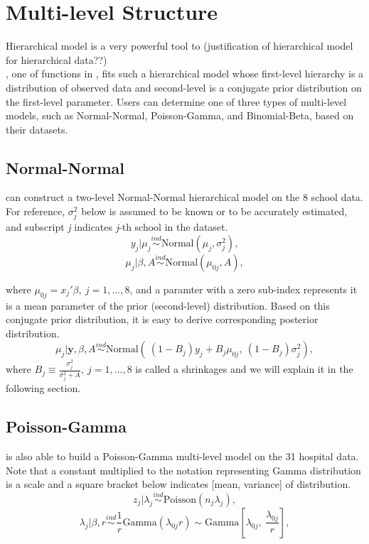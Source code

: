 \documentclass[article]{jss}
\begin{document}
\section[Multi-level Structure]{Multi-level Structure}
Hierarchical model is a very powerful tool to (justification of hierarchical model for hierarchical data??)
\\

, one of functions in , fits such a hierarchical model whose first-level hierarchy is a distribution of observed data and second-level is a conjugate prior distribution on the first-level parameter. Users can determine one of three types of multi-level models, such as Normal-Normal, Poisson-Gamma, and Binomial-Beta, based on their datasets. 
\\

 
\subsection[Normal-Normal]{Normal-Normal}
 can construct a two-level Normal-Normal hierarchical model on the 8 school data. For reference,  $\sigma^{2}_{j}$ below is assumed to be known or to be accurately estimated, and subscript \emph{j} indicates \emph{j}-th school in the dataset.
\begin{equation}
y_{j}\vert \mu_{j} \stackrel{ind}{\sim}\textrm{Normal}(\mu_{j}, \sigma^{2}_{j}),
\end{equation}
\begin{equation}
\mu_{j}\vert \beta, A\stackrel{ind}{\sim}\textrm{Normal}(\mu_{0j}, A),
\end{equation}

where $\mu_{0j} =x_{j}'\beta,~j=1, \ldots, 8$, and a paramter with a zero sub-index represents it is a mean parameter of the prior (second-level) distribution. Based on this conjugate prior distribution, it is easy to derive corresponding posterior distribution. 
\begin{equation}
\mu_{j}\vert \textbf{y}, \beta, A \stackrel{ind}{\sim}\textrm{Normal}(~(1-B_{j})y_{j} + B_{j}\mu_{0j},~(1-B_{j})\sigma^{2}_{j}),
\end{equation}
where $B_{j}\equiv\frac{\sigma^{2}_{j}}{\sigma^{2}_{j} + A},~j=1, \ldots, 8$ is called a shrinkages and we will explain it in the following section.

\subsection[Poisson-Gamma]{Poisson-Gamma}
 is also able to build a Poisson-Gamma multi-level model on the 31 hospital data. Note that a constant multiplied to the notation representing Gamma distribution is a scale and a square bracket below indicates [mean, variance] of distribution.
\begin{equation}
z_{j}\vert \lambda_{j} \stackrel{ind}{\sim}\textrm{Poisson}(n_{j}\lambda_{j}),
\end{equation}
\begin{equation}
\lambda_{j}\vert \beta, r\stackrel{ind}{\sim}\frac{1}{r}\textrm{Gamma}(\lambda_{0j}r)\sim \textrm{Gamma}[\lambda_{0j}, ~\frac{\lambda_{0j}}{r}],
\end{equation}
\end{document}
